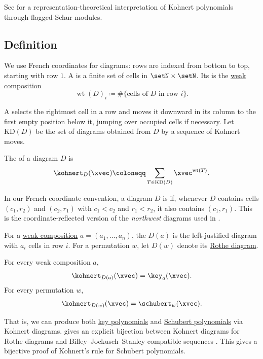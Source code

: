 See \cite{ArmonAssafBowlingEhrhard2023} for a representation-theoretical
interpretation of Kohnert polynomials through flagged Schur modules.


\subsection[kohnertDefinition]{Definition}

We use French coordinates for diagrams: rows are indexed from bottom to top,
starting with row \(1\). A \label{diagramDefinition} is a
finite set of cells in \(\setN \times \setN\). Its
\label{diagramWeight} is the
\hyperref[weakCompositionDefinition]{weak composition}
\[
 \operatorname{wt}(D)_i
 \coloneqq
 \#\{ \text{cells of } D \text{ in row } i\}.
\]

\begin{definition}
A \label{kohnertMove} selects the rightmost cell in a row
and moves it downward in its column to the first empty position below it,
jumping over occupied cells if necessary.  Let \(\mathrm{KD}(D)\) be the set
of diagrams obtained from \(D\) by a sequence of Kohnert moves.
\end{definition}

\begin{definition}
The \label{kohnertPolynomial} of a diagram \(D\) is
\[
 \kohnert_D(\xvec)
 \coloneqq
 \sum_{T \in \mathrm{KD}(D)}
 \xvec^{\operatorname{wt}(T)}.
\]
\end{definition}

In our French coordinate convention, a diagram \(D\) is
\label{southwestDiagram} if, whenever \(D\) contains cells
\((c_1,r_2)\) and \((c_2,r_1)\) with \(c_1\lt c_2\) and \(r_1\lt r_2\), it
also contains \((c_1,r_1)\).  This is the coordinate-reflected version of the
\emph{northwest} diagrams used in
\cite{ArmonAssafBowlingEhrhard2023}.

For a \hyperref[weakCompositionDefinition]{weak composition}
\(a=(a_1,\dotsc,a_n)\), the \label{keyDiagram}
\(D(a)\) is the left-justified diagram with \(a_i\) cells in row \(i\).
For a permutation \(w\), let \(D(w)\) denote its \hyperref[rotheDiagram]{Rothe diagram}.

\begin{theorem}
For every weak composition \(a\),
\[
 \kohnert_{D(a)}(\xvec)=\key_a(\xvec).
\]
For every permutation \(w\),
\[
 \kohnert_{D(w)}(\xvec)=\schubert_w(\xvec).
\]
\end{theorem}
That is, we can produce both \hyperref[key]{key polynomials} and
\hyperref[schubert]{Schubert polynomials} via Kohnert diagrams.
 gives an explicit bijection between Kohnert diagrams for
Rothe diagrams and Billey--Jockusch--Stanley compatible sequences
\cite{Assaf2022}.  This gives a bijective proof of Kohnert's rule for
Schubert polynomials.

